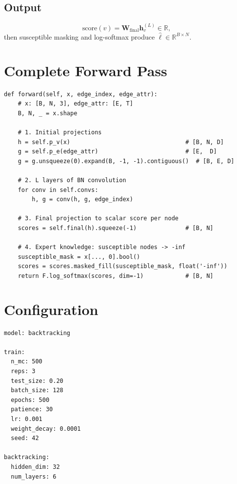 \documentclass[12pt,a4paper]{report}
\newcommand{\R}{\mathbb{R}}
\newcommand{\bh}{\mathbf{h}}
\newcommand{\bW}{\mathbf{W}}
\begin{document}
\subsection{Output}

\begin{equation}
  \text{score}(v) = \bW_{\text{final}} \bh_v^{(L)} \in \R,
\end{equation}
then susceptible masking and log-softmax produce $\hat{\ell} \in \R^{B \times N}$.

\section{Complete Forward Pass}

\begin{lstlisting}[caption={BacktrackingNetwork forward pass (from \texttt{gnn/backtracking\_network.py}).}]
def forward(self, x, edge_index, edge_attr):
    # x: [B, N, 3], edge_attr: [E, T]
    B, N, _ = x.shape

    # 1. Initial projections
    h = self.p_v(x)                                 # [B, N, D]
    g = self.p_e(edge_attr)                         # [E,  D]
    g = g.unsqueeze(0).expand(B, -1, -1).contiguous()  # [B, E, D]

    # 2. L layers of BN convolution
    for conv in self.convs:
        h, g = conv(h, g, edge_index)

    # 3. Final projection to scalar score per node
    scores = self.final(h).squeeze(-1)              # [B, N]

    # 4. Expert knowledge: susceptible nodes -> -inf
    susceptible_mask = x[..., 0].bool()
    scores = scores.masked_fill(susceptible_mask, float('-inf'))
    return F.log_softmax(scores, dim=-1)            # [B, N]
\end{lstlisting}

\section{Configuration}

\begin{lstlisting}[language=bash,caption={BacktrackingNetwork config (\texttt{exp/france\_office/backtracking.yml}).}]
model: backtracking

train:
  n_mc: 500
  reps: 3
  test_size: 0.20
  batch_size: 128
  epochs: 500
  patience: 30
  lr: 0.001
  weight_decay: 0.0001
  seed: 42

backtracking:
  hidden_dim: 32
  num_layers: 6
\end{lstlisting}
\end{document}
